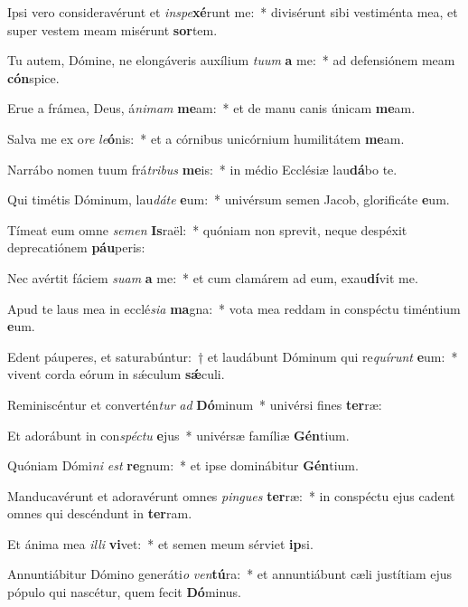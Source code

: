 \item Ipsi vero consideravérunt et \textit{in}\textit{spe}\textbf{xé}runt me:~* divisérunt sibi vestiménta mea, et super vestem meam misérunt \textbf{sor}tem.
\item Tu autem, Dómine, ne elongáveris auxílium \textit{tu}\textit{um} \textbf{a} me:~* ad defensiónem meam \textbf{cón}spice.
\item Erue a frámea, Deus, á\textit{ni}\textit{mam} \textbf{me}am:~* et de manu canis únicam \textbf{me}am.
\item Salva me ex o\textit{re} \textit{le}\textbf{ó}nis:~* et a córnibus unicórnium humilitátem \textbf{me}am.
\item Narrábo nomen tuum frá\textit{tri}\textit{bus} \textbf{me}is:~* in médio Ecclésiæ lau\textbf{dá}bo te.
\item Qui timétis Dóminum, lau\textit{dá}\textit{te} \textbf{e}um:~* univérsum semen Jacob, glorificáte \textbf{e}um.
\item Tímeat eum omne \textit{se}\textit{men} \textbf{Is}raël:~* quóniam non sprevit, neque despéxit deprecatiónem \textbf{páu}peris:
\item Nec avértit fáciem \textit{su}\textit{am} \textbf{a} me:~* et cum clamárem ad eum, exau\textbf{dí}vit me.
\item Apud te laus mea in ecclé\textit{si}\textit{a} \textbf{ma}gna:~* vota mea reddam in conspéctu timéntium \textbf{e}um.
\item Edent páuperes, et saturabúntur:~† et laudábunt Dóminum qui re\textit{quí}\textit{runt} \textbf{e}um:~* vivent corda eórum in sǽculum \textbf{sǽ}culi.
\item Reminiscéntur et convertén\textit{tur} \textit{ad} \textbf{Dó}minum~* univérsi fines \textbf{ter}ræ:
\item Et adorábunt in con\textit{spéc}\textit{tu} \textbf{e}jus~* univérsæ famíliæ \textbf{Gén}tium.
\item Quóniam Dómi\textit{ni} \textit{est} \textbf{re}gnum:~* et ipse dominábitur \textbf{Gén}tium.
\item Manducavérunt et adoravérunt omnes \textit{pin}\textit{gues} \textbf{ter}ræ:~* in conspéctu ejus cadent omnes qui descéndunt in \textbf{ter}ram.
\item Et ánima mea \textit{il}\textit{li} \textbf{vi}vet:~* et semen meum sérviet \textbf{ip}si.
\item Annuntiábitur Dómino generáti\textit{o} \textit{ven}\textbf{tú}ra:~* et annuntiábunt cæli justítiam ejus pópulo qui nascétur, quem fecit \textbf{Dó}minus.
